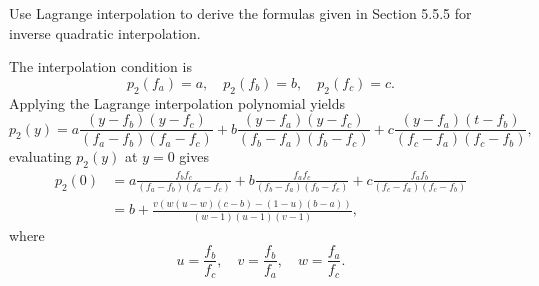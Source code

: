 \begin{pro}
  Use Lagrange interpolation to derive the formulas given in
  Section 5.5.5 for inverse quadratic interpolation.
\end{pro}

\begin{sol}
  The interpolation condition is
  \begin{displaymath}
    p_2(f_a) = a, \quad p_2(f_b) = b, \quad p_2(f_c) = c.
  \end{displaymath}
  Applying the Lagrange interpolation polynomial yields
  \begin{displaymath}
    p_2(y) = a \frac{(y-f_b)(y-f_c)}{(f_a-f_b)(f_a-f_c)}
    + b \frac{(y-f_a)(y-f_c)}{(f_b-f_a)(f_b-f_c)}
    + c \frac{(y-f_a)(t-f_b)}{(f_c-f_a)(f_c-f_b)},
  \end{displaymath}
  evaluating $p_2(y)$ at $y=0$ gives
  \begin{align*}
    p_2(0) &= a \frac{f_bf_c}{(f_a-f_b)(f_a-f_c)}
    + b \frac{f_af_c}{(f_b-f_a)(f_b-f_c)}
             + c \frac{f_af_b}{(f_c-f_a)(f_c-f_b)} \\
    &= b + \frac{v(w(u-w)(c-b) - (1-u)(b-a))}{(w-1)(u-1)(v-1)},
  \end{align*}
  where
  \begin{displaymath}
    u = \frac{f_b}{f_c}, \quad v = \frac{f_b}{f_a}, \quad
    w = \frac{f_a}{f_c}.
  \end{displaymath}
\end{sol}

